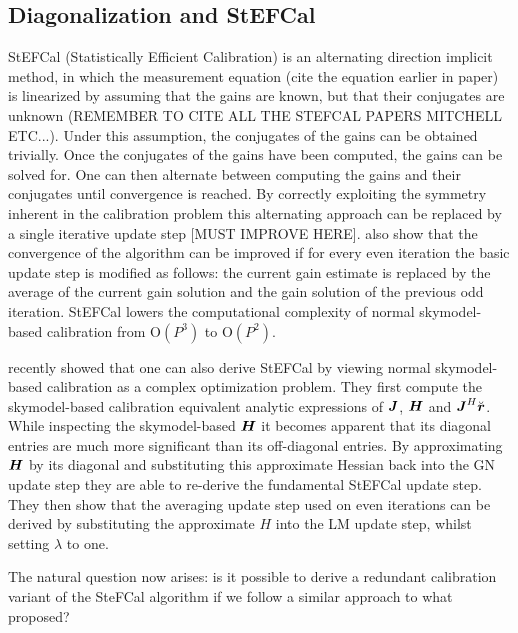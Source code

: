 \documentclass[useAMS,usenatbib]{mn2e}
\newcommand{\br}{\bmath{r}}
\newcommand{\bJ}{\bmath{J}}
\newcommand{\bH}{\bmath{H}}
\begin{document}
\subsection{Diagonalization and StEFCal}
StEFCal (Statistically Efficient Calibration) is an alternating direction implicit method, in which the measurement equation (cite the equation earlier in paper) is linearized by assuming that the gains are known, but
that their conjugates are unknown (REMEMBER TO CITE ALL THE STEFCAL PAPERS MITCHELL ETC...). Under this assumption, the conjugates of the gains can be obtained trivially. Once the conjugates of the gains have been computed, the gains can be solved for. One can then alternate between computing the gains and their conjugates until convergence
is reached. By correctly exploiting the symmetry inherent in the calibration problem this alternating approach can be replaced by a single iterative update step [MUST IMPROVE HERE]. \cite{Salvini2014} also show that
the convergence of the algorithm can be improved if for every even iteration the basic update step is modified as follows: the current gain estimate is replaced by the average of the current gain solution and the gain solution of the previous odd iteration.
StEFCal lowers the computational complexity of normal skymodel-based calibration from O$(P^3)$ to O$(P^2)$. 

\citet{Smirnov2015} recently showed that one can also derive StEFCal by viewing normal skymodel-based calibration as a complex optimization problem. They first compute the skymodel-based calibration equivalent analytic expressions of $\bJ$,
$\bH$ and $\bJ^H\breve{\br}$. While inspecting the skymodel-based $\bH$ it becomes apparent that its diagonal entries are much more significant than its off-diagonal entries.
By approximating $\bH$ by its diagonal and substituting this approximate Hessian back into the GN update step they are able to re-derive the fundamental StEFCal update step. They then show that the 
averaging update step used on even iterations can be derived by substituting the approximate $H$ into the LM update step, whilst setting $\lambda$ to one.

The natural question now arises: is it possible to derive a redundant calibration variant of the SteFCal algorithm if we follow a similar approach to what \citet{Smirnov2015}
proposed?
\end{document}
